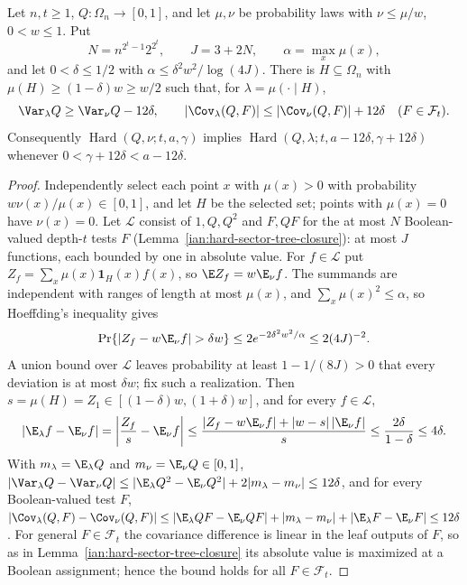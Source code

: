 \begin{lemma}
\label{ian:hard-sector-rounding}
Let \(n,t\ge1\), \(Q:\Omega_n\to[0,1]\), and let \(\mu,\nu\) be
probability laws with \(\nu\le\mu/w\), \(0<w\le1\). Put
\[
 N=n^{2^t-1}2^{2^t},\qquad J=3+2N,\qquad
 \alpha=\max_x\mu(x),
\]
and let \(0<\delta\le1/2\) with
\(\alpha\le\delta^2w^2/\log(4J)\).
There is \(H\subseteq\Omega_n\) with \(\mu(H)\ge(1-\delta)w\ge w/2\) such
that, for \(\lambda=\mu(\cdot\mid H)\),
\[
 \Var_\lambda Q\ge\Var_\nu Q-12\delta,\qquad
 |\Cov_\lambda(Q,F)|\le|\Cov_\nu(Q,F)|+12\delta\quad(F\in\mathcal F_t).
\]
Consequently \(\operatorname{Hard}(Q,\nu;t,a,\gamma)\) implies
\(\operatorname{Hard}(Q,\lambda;t,a-12\delta,\gamma+12\delta)\)
whenever \(0<\gamma+12\delta<a-12\delta\).
\end{lemma}

\begin{proof}
Independently select each point \(x\) with \(\mu(x)>0\) with probability
\(w\nu(x)/\mu(x)\in[0,1]\), and let \(H\) be the selected set; points
with \(\mu(x)=0\) have \(\nu(x)=0\). Let \(\mathcal L\) consist of
\(1,Q,Q^2\) and \(F,QF\) for the at most \(N\) Boolean-valued depth-\(t\)
tests \(F\) (Lemma~\ref{ian:hard-sector-tree-closure}): at most \(J\)
functions, each bounded by one in absolute value. For
\(f\in\mathcal L\) put \(Z_f=\sum_x\mu(x)\mathbf1_H(x)f(x)\), so
\(\E Z_f=w\E_\nu f\). The summands are independent with ranges of length
at most \(\mu(x)\), and \(\sum_x\mu(x)^2\le\alpha\), so Hoeffding's
inequality gives
\[
 \Pr\{|Z_f-w\E_\nu f|>\delta w\}\le2e^{-2\delta^2w^2/\alpha}\le2(4J)^{-2}.
\]
A union bound over \(\mathcal L\) leaves probability at least
\(1-1/(8J)>0\) that every deviation is at most \(\delta w\); fix such a
realization. Then \(s=\mu(H)=Z_1\in[(1-\delta)w,(1+\delta)w]\), and for
every \(f\in\mathcal L\),
\[
 |\E_\lambda f-\E_\nu f|
 =\left|\frac{Z_f}{s}-\E_\nu f\right|
 \le\frac{|Z_f-w\E_\nu f|+|w-s|\,|\E_\nu f|}{s}
 \le\frac{2\delta}{1-\delta}\le4\delta.
\]
With \(m_\lambda=\E_\lambda Q\) and \(m_\nu=\E_\nu Q\in[0,1]\),
\(|\Var_\lambda Q-\Var_\nu Q|\le|\E_\lambda Q^2-\E_\nu Q^2|+2|m_\lambda-m_\nu|\le12\delta\),
and for every Boolean-valued test \(F\),
\(|\Cov_\lambda(Q,F)-\Cov_\nu(Q,F)|\le|\E_\lambda QF-\E_\nu QF|+|m_\lambda-m_\nu|+|\E_\lambda F-\E_\nu F|\le12\delta\).
For general \(F\in\mathcal F_t\) the covariance difference is linear in
the leaf outputs of \(F\), so as in
Lemma~\ref{ian:hard-sector-tree-closure} its absolute value is maximized
at a Boolean assignment; hence the bound holds for all
\(F\in\mathcal F_t\).
\end{proof}


